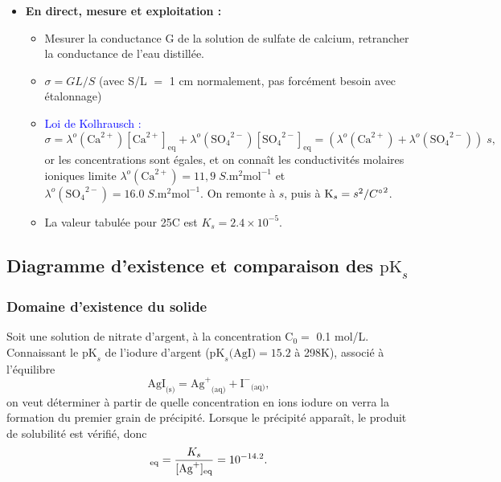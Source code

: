 \documentclass[11pt,a4paper]{report}
\begin{document}
\begin{itemize}
	\item \textbf{En direct, mesure et exploitation :}
	\begin{itemize}
		\item Mesurer la conductance G de la solution de sulfate de calcium, retrancher la 						conductance de l'eau distillée.
		\item $\sigma = G L/S$ (avec S/L $=$ 1 cm normalement, pas forcément besoin avec 						étalonnage)\\
		\item \textcolor{blue}{Loi de Kolhrausch :}
		\begin{equation}
			\sigma = \lambda^o(\text{Ca}^{2+})[\text{Ca}^{2+}]_\text{eq} 
			+ \lambda^o({\text{SO}_4}^{2-})[{\text{SO}_4}^{2-}]_\text{eq}
			= \left(\lambda^o(\text{Ca}^{2+}) + \lambda^o({\text{SO}_4}^{2-})\right)\;s,
		\end{equation}
		or les concentrations sont égales, et on connaît les conductivités molaires ioniques limite
		$\lambda^o(\text{Ca}^{2+}) = 11,9\;S.\text{m}^2\text{mol}^{-1}$ 
		et $\lambda^o({\text{SO}_4}^{2-}) = 16.0\;S.\text{m}^2\text{mol}^{-1}$. On remonte à $s$, 			puis à $\text{K}_s = s^2/{C\degree}^2$.
	
		\item La valeur tabulée pour 25\degree C est $K_s = 2.4\times10^{-5}$.	
	\end{itemize}
\end{itemize}

\subsection{Diagramme d'existence et comparaison des $\text{pK}_s$}

\subsubsection{Domaine d'existence du solide}
Soit une solution de nitrate d'argent, à la concentration $\text{C}_0 =$ 0.1 mol/L. Connaissant le $\text{pK}_s$ de l'iodure d'argent ($\text{pK}_s\text{(AgI)} = 15.2$ à 298K), associé à l'équilibre
\begin{equation}
	\text{AgI}_\text{(s)} = {\text{Ag}^+}_\text{(aq)} + {\text{I}^-}_\text{(aq)},
\end{equation}
on veut déterminer à partir de quelle concentration en ions iodure on verra la formation du premier grain de précipité. Lorsque le précipité apparaît, le produit de solubilité est vérifié, donc
\begin{equation}
	[\text{I}^-]_\text{eq} = \frac{K_s}{[\text{Ag}^+]_\text{eq}} = 10^{-14.2}.\\
\end{equation}
\end{document}
